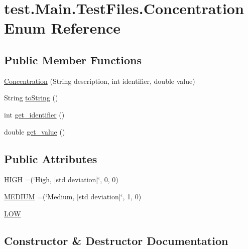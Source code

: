 \hypertarget{enumtest_1_1_main_1_1_test_files_1_1_concentration}{}\section{test.\+Main.\+Test\+Files.\+Concentration Enum Reference}
\label{enumtest_1_1_main_1_1_test_files_1_1_concentration}
\subsection*{Public Member Functions}
\begin{DoxyCompactItemize}
\item 
\hyperlink{enumtest_1_1_main_1_1_test_files_1_1_concentration_a8365a18de30b5d4538b2bc3a105ca652}{Concentration} (String description, int identifier, double value)
\item 
String \hyperlink{enumtest_1_1_main_1_1_test_files_1_1_concentration_a0669104e51effe316491287b5ce9366f}{to\+String} ()
\item 
int \hyperlink{enumtest_1_1_main_1_1_test_files_1_1_concentration_a45beb7f5967ebd747c9d325286f25125}{get\+\_\+identifier} ()
\item 
double \hyperlink{enumtest_1_1_main_1_1_test_files_1_1_concentration_aaae7c673fc7a17d505de14d962b16e59}{get\+\_\+value} ()
\end{DoxyCompactItemize}
\subsection*{Public Attributes}
\begin{DoxyCompactItemize}
\item 
\hyperlink{enumtest_1_1_main_1_1_test_files_1_1_concentration_a9de91ec8dd5ed01507aea649af87b0ed}{H\+I\+GH} =(\char`\"{}High, \mbox{[}std deviation\mbox{]}\char`\"{}, 0, 0)
\item 
\hyperlink{enumtest_1_1_main_1_1_test_files_1_1_concentration_aa63ada2a9617b0ac561c5ca3d0e31069}{M\+E\+D\+I\+UM} =(\char`\"{}Medium, \mbox{[}std deviation\mbox{]}\char`\"{}, 1, 0)
\item 
\hyperlink{enumtest_1_1_main_1_1_test_files_1_1_concentration_a07f065b4d257d7e4234c210f603daa03}{L\+OW}
\end{DoxyCompactItemize}


\subsection{Constructor \& Destructor Documentation}

